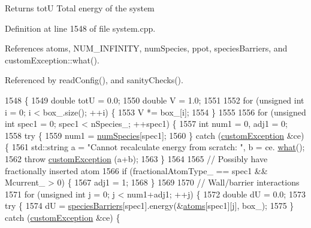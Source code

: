 \begin{DoxyReturn}{Returns}
tot\-U Total energy of the system 
\end{DoxyReturn}


Definition at line 1548 of file system.\-cpp.



References atoms, N\-U\-M\-\_\-\-I\-N\-F\-I\-N\-I\-T\-Y, num\-Species, ppot, species\-Barriers, and custom\-Exception\-::what().



Referenced by read\-Config(), and sanity\-Checks().


\begin{DoxyCode}
1548                                        \{
1549     \textcolor{keywordtype}{double} totU = 0.0;
1550     \textcolor{keywordtype}{double} V = 1.0;
1551 
1552     \textcolor{keywordflow}{for} (\textcolor{keywordtype}{unsigned} \textcolor{keywordtype}{int} i = 0; i < box\_.size(); ++i) \{
1553         V *= box\_[i];
1554     \}
1555 
1556     \textcolor{keywordflow}{for} (\textcolor{keywordtype}{unsigned} \textcolor{keywordtype}{int} spec1 = 0; spec1 < nSpecies\_; ++spec1) \{
1557         \textcolor{keywordtype}{int} num1 = 0, adj1 = 0;
1558         \textcolor{keywordflow}{try} \{
1559             num1 = \hyperlink{classsim_system_a9eea865e6dc1cff377b1e79c4d9c23f0}{numSpecies}[spec1];
1560         \} \textcolor{keywordflow}{catch} (\hyperlink{classcustom_exception}{customException} &ce) \{
1561             std::string a = \textcolor{stringliteral}{"Cannot recalculate energy from scratch: "}, b = ce.
      \hyperlink{classcustom_exception_aeb6ab5848b038adfc68fde86a512f691}{what}();
1562             \textcolor{keywordflow}{throw} \hyperlink{classcustom_exception}{customException} (a+b);
1563         \}
1564 
1565         \textcolor{comment}{// Possibly have fractionally inserted atom}
1566         \textcolor{keywordflow}{if} (fractionalAtomType\_ == spec1 && Mcurrent\_ > 0) \{
1567             adj1 = 1;
1568         \}
1569 
1570         \textcolor{comment}{// Wall/barrier interactions}
1571         \textcolor{keywordflow}{for} (\textcolor{keywordtype}{unsigned} \textcolor{keywordtype}{int} j = 0; j < num1+adj1; ++j) \{
1572             \textcolor{keywordtype}{double} dU = 0.0;
1573             \textcolor{keywordflow}{try} \{
1574                 dU = \hyperlink{classsim_system_a5ae652ff4519f39c3862abae32a9581b}{speciesBarriers}[spec1].energy(&\hyperlink{classsim_system_a90421b19082f7fb8fc23b7264b1161e4}{atoms}[spec1][j], box\_);
1575             \} \textcolor{keywordflow}{catch} (\hyperlink{classcustom_exception}{customException} &ce) \{

\end{DoxyCode}
